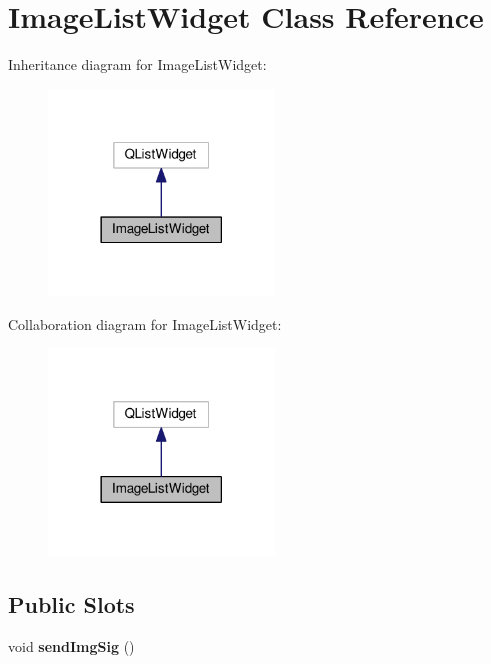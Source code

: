 \hypertarget{classImageListWidget}{}\section{Image\+List\+Widget Class Reference}
\label{classImageListWidget}


Inheritance diagram for Image\+List\+Widget\+:\nopagebreak
\begin{figure}[H]
\begin{center}
\leavevmode
\includegraphics[width=170pt]{classImageListWidget__inherit__graph}
\end{center}
\end{figure}


Collaboration diagram for Image\+List\+Widget\+:\nopagebreak
\begin{figure}[H]
\begin{center}
\leavevmode
\includegraphics[width=170pt]{classImageListWidget__coll__graph}
\end{center}
\end{figure}
\subsection*{Public Slots}
\begin{DoxyCompactItemize}
\item 
void {\bfseries send\+Img\+Sig} ()\hypertarget{classImageListWidget_af072df1937a13d6477d65f9f0440b38b}{}\label{classImageListWidget_af072df1937a13d6477d65f9f0440b38b}

\end{DoxyCompactItemize}
